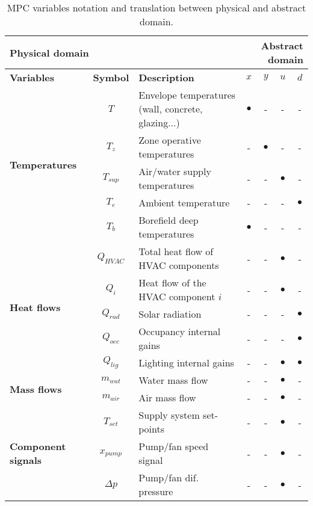 \documentclass[10pt]{extarticle}
\begin{document}
\begin{table}[h]
	\centering
	\caption{MPC variables notation and translation between physical and abstract domain.}
	\label{tab:mpc_form:translation}
	\begin{tabular}{l|c|l|cccc}
		\toprule
		\multicolumn{3}{l}{\textbf{Physical domain}} &  \multicolumn{4}{r}{\textbf{Abstract domain}} \\
		\toprule
		\textbf{Variables} & \textbf{Symbol} & \textbf{Description} & \textbf{$x$} & \textbf{$y$} & \textbf{$u$} & \textbf{$d$} \\ 
		\midrule
		\multirow{5}{*}{\textbf{Temperatures}} & $T$ & Envelope temperatures (wall, concrete, glazing...) & $\bullet$ & - & - & - \\ 
		& $T_z$ & Zone operative temperatures & - & $\bullet$ & - & - \\
		& $T_{sup}$ & Air/water supply temperatures &  - & - & $\bullet$ & - \\
		& $T_e$ & Ambient temperature &  - & - & - & $\bullet$ \\
		& $T_b$ & Borefield deep temperatures & $\bullet$ & - & - & - \\
		\midrule
		\multirow{5}{*}{\textbf{Heat flows}} &
		$Q_{HVAC}$ & Total heat flow of HVAC components & - & - & $\bullet$ & - \\
		& $Q_{i}$ & Heat flow of the HVAC component $i$ & - & - &  $\bullet$ &- \\
		& $Q_{rad}$ & Solar radiation & - & - & - & $\bullet$ \\
		& $Q_{occ}$ & Occupancy internal gains & - & - & - & $\bullet$ \\
		& $Q_{lig}$ & Lighting internal gains & - & - & $\bullet$ & $\bullet$ \\
		\midrule
		\multirow{2}{*}{\textbf{Mass flows}} &
		$m_{wat}$ & Water mass flow & - & - & $\bullet$ & - \\
		& $m_{air}$ & Air mass flow & - & - & $\bullet$ & - \\
		\midrule
		\multirow{5}{*}{\textbf{Component signals}} &
		$T_{set}$ & Supply system set-points & - & - & $\bullet$ & - \\
		& $x_{pump}$ & Pump/fan speed signal & - & - & $\bullet$ & - \\
		& $\Delta p$ & Pump/fan dif. pressure & - & - & $\bullet$ & - \\

\end{tabular}
\end{table}
\end{document}
